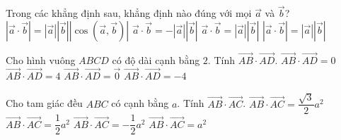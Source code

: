 

\begin{ex}%
	Trong các khẳng định sau, khẳng định nào đúng với mọi $\overrightarrow a$ và $\overrightarrow  b$?
	 \choice
		{\True $\left| \overrightarrow a\cdot \overrightarrow b  \right|=\left| \overrightarrow a \right|\left| \overrightarrow b \right|\left| \cos\left( \overrightarrow a,\overrightarrow b \right) \right|$}
		{$\overrightarrow a\cdot \overrightarrow b=-\left| \overrightarrow  a \right|\left| \overrightarrow b \right|$}
		{$\overrightarrow a\cdot \overrightarrow b=\left| \overrightarrow a \right|\left| \overrightarrow b \right|$} 
		{$\left| \overrightarrow a\cdot \overrightarrow b  \right|=\left| \overrightarrow a \right|\left| \overrightarrow b \right|$}
\end{ex}

\begin{ex}%
	Cho hình vuông $ABCD$ có độ dài cạnh bằng $2$.  Tính $\overrightarrow{AB} \cdot \overrightarrow{AD}$.
	 \choice
		 {\True $\overrightarrow{AB} \cdot \overrightarrow{AD}=0$}
		{$\overrightarrow{AB} \cdot \overrightarrow{AD}=4$} 
		 {$\overrightarrow{AB} \cdot \overrightarrow{AD}=\overrightarrow 0$}
		{$\overrightarrow{AB} \cdot \overrightarrow{AD}=-4$} 
\end{ex}

\begin{ex}%
	Cho tam giác đều $ABC$ có cạnh bằng  $a$. Tính $\overrightarrow{AB} \cdot \overrightarrow{AC}$.
	 \choice
		{$\overrightarrow{AB} \cdot \overrightarrow{AC}=\dfrac{\sqrt 3}{2}a^2$} 
		{\True $\overrightarrow{AB} \cdot \overrightarrow{AC}=\dfrac{1}{2}a^2$} 
		{$\overrightarrow{AB} \cdot \overrightarrow{AC}=-\dfrac{1}{2}a^2$} 
		{$\overrightarrow{AB} \cdot  \overrightarrow{AC}=a^2$}
\end{ex}

